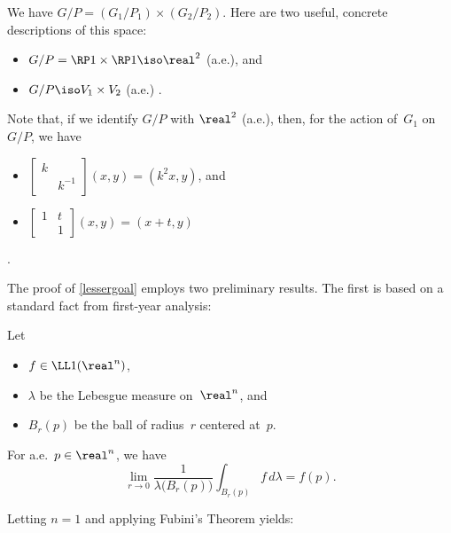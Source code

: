 \begin{rem} \label{G/PisR2}
We have $G/P = (G_1/P_1) \times (G_2/ P_2)$. Here are two useful, concrete descriptions of this space:
\begin{itemize}
\item $G/P = \RP1 \times \RP1 \iso \real^2$ (a.e.),
and
\item $G/P \iso V_1 \times V_2$ (a.e.) .
\end{itemize}
Note that, if we identify $G/P$ with $\real^2$ (a.e.), then, for the action of~$G_1$ on~$G/P$, we have
\begin{itemize}
\item $\begin{bmatrix} k& \\ &k^{-1} \end{bmatrix} (x,y) = (k^2 x, y)$,
and
\item $\begin{bmatrix} 1& t \\ &1 \end{bmatrix} (x,y) = (x + t, y)$
\end{itemize}
.
\end{rem}

The proof of \cref{lessergoal} employs two preliminary results.
The first is based on a standard fact from first-year analysis:

\begin{lem} \label{LebDiffThm}
Let 
	\begin{itemize}
	\item $f \in \LL1(\real^n)$, 
	\item $\lambda$ be the Lebesgue measure on~$\real^n$,
	and
	\item $B_r(p)$ be the ball of radius~$r$ centered at~$p$.
	\end{itemize}
For a.e.\ $p \in \real^n$, we have
	\begin{equation} \label{LebDiffThmEq}
	\lim_{r \to 0} \frac{1}{\lambda \bigl( B_r(p) \bigr)}\int_{B_r(p)} f \, d\lambda = f(p) 
	. \end{equation}
\end{lem}

Letting $n = 1$ and applying Fubini's Theorem yields:

